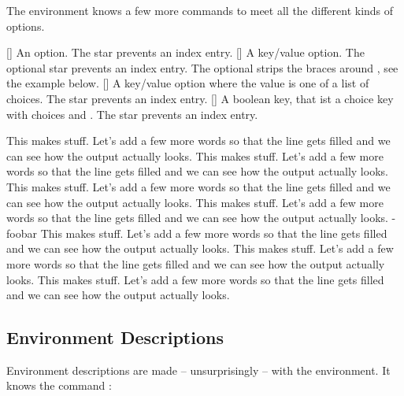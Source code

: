 \documentclass[load-preamble]{cnltx-doc}
\begin{document}
The  environment knows a few more commands to meet all the
different kinds of options.
\begin{commands}
  [\sarg]
    An option.  The star prevents an index entry.
  [\sarg\code{-}]
    A key/value option.  The optional star prevents an index entry.  The
    optional \code{-} strips the braces around , see the example
    below.
  [\sarg{}]
    A key/value option where the value is one of a list of choices.  The star
    prevents an index entry.
  [\sarg{}]
    A boolean key, that ist a choice key with choices  and 
    .  The star prevents an index entry.
\end{commands}

\begin{example}
  \begin{options}
      This makes stuff.  Let's add a few more words so that the line gets
      filled and we can see how the output actually looks.
      This makes stuff.  Let's add a few more words so that the line gets
      filled and we can see how the output actually looks.
    \Default
      This makes stuff.  Let's add a few more words so that the line gets
      filled and we can see how the output actually looks.
      This makes stuff.  Let's add a few more words so that the line gets
      filled and we can see how the output actually looks.
    \keyval-{foo}{bar}
      This makes stuff.  Let's add a few more words so that the line gets
      filled and we can see how the output actually looks.
      This makes stuff.  Let's add a few more words so that the line gets
      filled and we can see how the output actually looks.
      This makes stuff.  Let's add a few more words so that the line gets
      filled and we can see how the output actually looks.
  \end{options}
\end{example}

\subsection{Environment Descriptions}\label{sec:usage:environments}

Environment descriptions are made -- unsurprisingly -- with the
 environment.  It knows the command :
\end{document}
